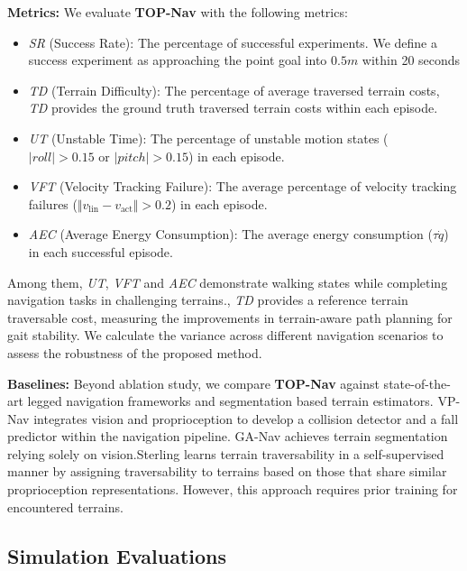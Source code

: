 \documentclass[conference]{IEEEtran}
\begin{document}
\noindent\textbf{Metrics:} We evaluate \textbf{TOP-Nav} with the following metrics:
\begin{itemize}
    \item \textit{SR} {(Success Rate)}: {The percentage of successful experiments. We define a success experiment as approaching the point goal into ${0.5m}$ within 20 seconds}
    \item \textit{TD} {(Terrain Difficulty)}: The percentage of average traversed terrain costs, {\textit{TD} provides the ground truth traversed terrain costs within each episode}.
    \item \textit{UT} {(Unstable Time)}: The percentage of unstable motion states ($\lvert roll \rvert>0.15 \text{ or } \lvert pitch \rvert > 0.15$) in each episode.
    \item \textit{VFT} {(Velocity Tracking Failure)}: The average percentage of velocity tracking failures ($\Vert v_{\textrm{lin}}-v_{\textrm{act}}\Vert>0.2$) in each episode.
    \item \textit{AEC} {(Average Energy Consumption)}: The average energy consumption ($\tau \dot {q}$) \cite{fu2021minimizing} in each successful episode.
\end{itemize}
Among them, \textit{UT}, \textit{VFT} and \textit{AEC} demonstrate walking states while completing navigation tasks in challenging terrains., \textit{TD} provides a reference terrain traversable cost, measuring the improvements in terrain-aware path planning for gait stability. We calculate the variance across different navigation scenarios to assess the robustness of the proposed method.

\noindent\textbf{Baselines:} Beyond ablation study, we compare \textbf{TOP-Nav} against state-of-the-art legged navigation frameworks and segmentation based terrain estimators. VP-Nav \cite{fu2022coupling} integrates vision and proprioception to develop a collision detector and a fall predictor within the navigation pipeline. GA-Nav \cite{guan2022ga} achieves terrain segmentation relying solely on vision.{Sterling \cite{karnan2023sterling} learns terrain traversability in a self-supervised manner by assigning traversability to terrains based on those that share similar proprioception representations. However, this approach requires prior training for encountered terrains.} 

\subsection{Simulation Evaluations}
\end{document}
